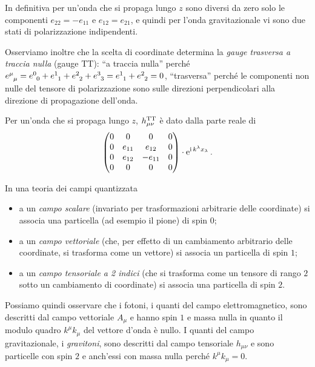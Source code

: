 In definitiva per un'onda che si propaga lungo $z$ sono diversi da zero solo le
componenti $e_{22} = -e_{11}$ e $e_{12} = e_{21}$, e quindi per l'onda
gravitazionale vi sono due stati di polarizzazione indipendenti.

Osserviamo inoltre che la scelta di coordinate determina la
\emph{gauge trasversa a traccia nulla}
(gauge TT): ``a traccia nulla'' perché $\tensor{e}{^{\mu}_{\mu}} =
\tensor{e}{^{0}_{0}} + \tensor{e}{^{1}_{1}} + \tensor{e}{^{2}_{2}} +
\tensor{e}{^{3}_{3}} = \tensor{e}{^{1}_{1}} + \tensor{e}{^{2}_{2}} = 0$,
``trasversa'' perché le componenti non nulle del tensore di polarizzazione sono
sulle direzioni perpendicolari alla direzione di propagazione dell'onda.

Per un'onda che si propaga lungo $z$, $h_{\mu\nu}^{\textup{TT}}$ è dato dalla
parte reale di
\begin{equation}
  \begin{pmatrix}
    0 & 0      & 0       & 0 \\
    0 & e_{11} & e_{12}  & 0 \\
    0 & e_{12} & -e_{11} & 0 \\
    0 & 0      & 0       & 0
  \end{pmatrix}\cdot \operatorname{\mathrm{e}}^{\operatorname{\mathrm{i}} k^{\lambda}x_{\lambda}}.
\end{equation}

In una teoria dei campi quantizzata
\begin{itemize}
\item a un \emph{campo scalare} (invariato per trasformazioni arbitrarie delle
  coordinate) si associa una particella (ad esempio il pione) di spin $0$;
\item a un \emph{campo vettoriale} (che, per effetto di un cambiamento
  arbitrario delle coordinate, si trasforma come un vettore) si associa un
  particella di spin $1$;
\item a un \emph{campo tensoriale a 2 indici} (che si trasforma come un tensore
  di rango $2$ sotto un cambiamento di coordinate) si associa una particella di
  spin $2$.
\end{itemize}
Possiamo quindi osservare che i fotoni, i quanti del campo elettromagnetico,
sono descritti dal campo vettoriale $A_{\mu}$ e hanno spin $1$ e massa nulla in
quanto il modulo quadro $k^{\mu}k_{\mu}$ del vettore d'onda è nullo.  I quanti
del campo gravitazionale, i \emph{gravitoni}, sono descritti
dal campo tensoriale $h_{\mu\nu}$ e sono particelle con spin $2$ e anch'essi con
massa nulla perché $k^{\mu}k_{\mu} = 0$.

